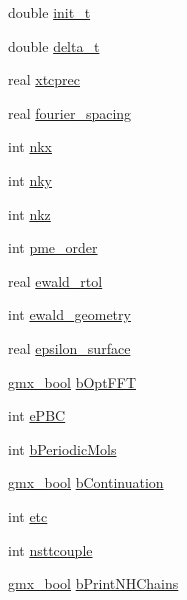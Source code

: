 \begin{DoxyCompactItemize}
\item 
double \hyperlink{structt__inputrec_ac7539e715ff3cdb48ac9899cb42bd945}{init\-\_\-t}
\item 
double \hyperlink{structt__inputrec_a7cac69030ae502ca01a26ee72fb32e6d}{delta\-\_\-t}
\item 
real \hyperlink{structt__inputrec_a2641aa5a451b70cc9faf535a1c1acb80}{xtcprec}
\item 
real \hyperlink{structt__inputrec_a4e5b06126a415845b182632b22cd5c4f}{fourier\-\_\-spacing}
\item 
int \hyperlink{structt__inputrec_a18ab3d6162c2baa3ecdc9fc70cf2c6ef}{nkx}
\item 
int \hyperlink{structt__inputrec_a47770e5692549c8cc53879c2cadd5719}{nky}
\item 
int \hyperlink{structt__inputrec_ade113af35a8f685cb9797a535df4696b}{nkz}
\item 
int \hyperlink{structt__inputrec_a114f32468f461e0d42ba6779918ecc72}{pme\-\_\-order}
\item 
real \hyperlink{structt__inputrec_a58ab07cb5544e8ffbe04f1f6133b8004}{ewald\-\_\-rtol}
\item 
int \hyperlink{structt__inputrec_afc3bc47a04f3f01a65c0fbb7fa25c912}{ewald\-\_\-geometry}
\item 
real \hyperlink{structt__inputrec_a6eb843b3a86abfe481b4f93cc390c645}{epsilon\-\_\-surface}
\item 
\hyperlink{include_2types_2simple_8h_a8fddad319f226e856400d190198d5151}{gmx\-\_\-bool} \hyperlink{structt__inputrec_af2c983ff4c3557a79c7c0424e602f358}{b\-Opt\-F\-F\-T}
\item 
int \hyperlink{structt__inputrec_a1ebf50f55f47927f1837a1d1d94f09c2}{e\-P\-B\-C}
\item 
int \hyperlink{structt__inputrec_a0cc9f5847c60cefa5014c94fa7af4280}{b\-Periodic\-Mols}
\item 
\hyperlink{include_2types_2simple_8h_a8fddad319f226e856400d190198d5151}{gmx\-\_\-bool} \hyperlink{structt__inputrec_aaf1f5a62f35026725bfe904f2b5970dd}{b\-Continuation}
\item 
int \hyperlink{structt__inputrec_addf00f83e72b37947208a01c65001800}{etc}
\item 
int \hyperlink{structt__inputrec_a0fba57e3b8afd5a6a0192a2e32fd42ed}{nsttcouple}
\item 
\hyperlink{include_2types_2simple_8h_a8fddad319f226e856400d190198d5151}{gmx\-\_\-bool} \hyperlink{structt__inputrec_aac72376ae2e589d210f2d2b8c65c0dc8}{b\-Print\-N\-H\-Chains}
\item 

\end{DoxyCompactItemize}
